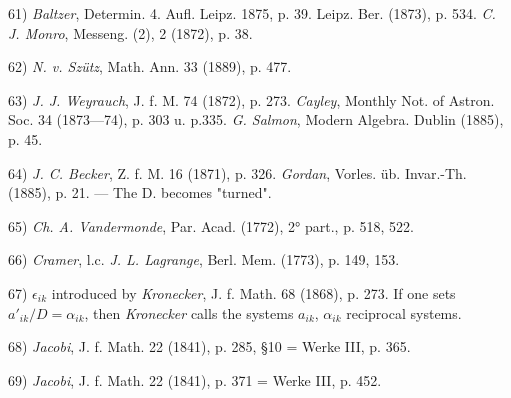 \vfill
\leftline{\rule{2in}{0.4pt}}
\vspace{0.2cm}
{
\footnotesize
61) \textit{Baltzer}, Determin. 4. Aufl. Leipz. 1875, p. 39. Leipz. Ber. (1873), p. 534. \textit{C. J. Monro}, Messeng. (2), 2 (1872), p. 38.

62) \textit{N. v. Szütz}, Math. Ann. 33 (1889), p. 477.

63) \textit{J. J. Weyrauch}, J. f. M. 74 (1872), p. 273. \textit{Cayley}, Monthly Not. of Astron. Soc. 34 (1873—74), p. 303 u. p.335. \textit{G. Salmon}, Modern Algebra. Dublin (1885), p. 45.

64) \textit{J. C. Becker}, Z. f. M. 16 (1871), p. 326. \textit{Gordan}, Vorles. üb. Invar.-Th. (1885), p. 21. — The D. becomes "turned".

65) \textit{Ch. A. Vandermonde}, Par. Acad. (1772), 2° part., p. 518, 522.

66) \textit{Cramer}, l.c. \textit{J. L. Lagrange}, Berl. Mem. (1773), p. 149, 153.

67) $\epsilon_{ik}$ introduced by \textit{Kronecker}, J. f. Math. 68 (1868), p. 273. If one sets $a'_{ik}/D=\alpha_{ik}$, then \textit{Kronecker} calls the systems $a_{ik}$, $\alpha_{ik}$ reciprocal systems.

68) \textit{Jacobi}, J. f. Math. 22 (1841), p. 285, §10 = Werke III, p. 365.

69) \textit{Jacobi}, J. f. Math. 22 (1841), p. 371 = Werke III, p. 452.

}

